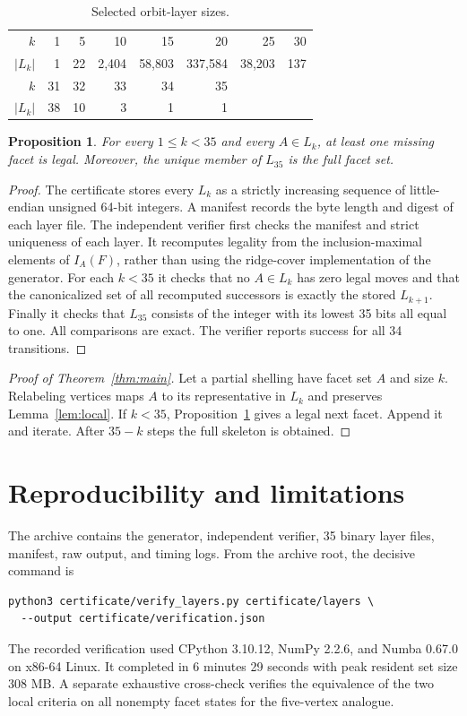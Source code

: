 \documentclass[11pt]{article}
\newtheorem{proposition}{Proposition}
\begin{document}
\begin{table}[ht]\centering
\caption{Selected orbit-layer sizes.}\label{tab:layers}
\begin{tabular}{rrrrrrrr}\toprule
$k$&1&5&10&15&20&25&30\\
$|L_k|$&1&22&2,404&58,803&337,584&38,203&137\\\midrule
$k$&31&32&33&34&35&&\\
$|L_k|$&38&10&3&1&1&&\\\bottomrule
\end{tabular}\end{table}

\begin{proposition}\label{prop:certificate}
For every $1\leq k<35$ and every $A\in L_k$, at least one missing facet is legal. Moreover, the unique member of $L_{35}$ is the full facet set.
\end{proposition}
\begin{proof}
The certificate stores every $L_k$ as a strictly increasing sequence of little-endian unsigned 64-bit integers. A manifest records the byte length and digest of each layer file. The independent verifier first checks the manifest and strict uniqueness of each layer. It recomputes legality from the inclusion-maximal elements of $I_A(F)$, rather than using the ridge-cover implementation of the generator. For each $k<35$ it checks that no $A\in L_k$ has zero legal moves and that the canonicalized set of all recomputed successors is exactly the stored $L_{k+1}$. Finally it checks that $L_{35}$ consists of the integer with its lowest 35 bits all equal to one. All comparisons are exact. The verifier reports success for all 34 transitions.
\end{proof}

\begin{proof}[Proof of Theorem~\ref{thm:main}]
Let a partial shelling have facet set $A$ and size $k$. Relabeling vertices maps $A$ to its representative in $L_k$ and preserves Lemma~\ref{lem:local}. If $k<35$, Proposition~\ref{prop:certificate} gives a legal next facet. Append it and iterate. After $35-k$ steps the full skeleton is obtained.
\end{proof}

\section{Reproducibility and limitations}
The archive contains the generator, independent verifier, 35 binary layer files, manifest, raw output, and timing logs. From the archive root, the decisive command is
\begin{verbatim}
python3 certificate/verify_layers.py certificate/layers \
  --output certificate/verification.json
\end{verbatim}
The recorded verification used CPython 3.10.12, NumPy 2.2.6, and Numba 0.67.0 on x86-64 Linux. It completed in 6 minutes 29 seconds with peak resident set size 308 MB. A separate exhaustive cross-check verifies the equivalence of the two local criteria on all nonempty facet states for the five-vertex analogue.
\end{document}
